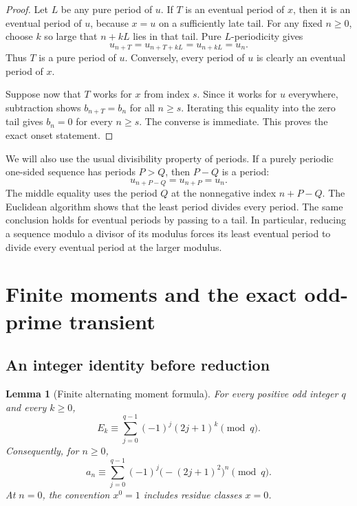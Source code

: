 \documentclass[11pt,a4paper]{article}
\numberwithin{equation}{section}
\newtheorem{lemma}[theorem]{Lemma}
\theoremstyle{definition}
\begin{document}
\begin{proof}
Let $L$ be any pure period of $u$. If $T$ is an eventual period of $x$,
then it is an eventual period of $u$, because $x=u$ on a sufficiently late
tail. For any fixed $n\ge0$, choose $k$ so large that $n+kL$ lies in that
tail. Pure $L$-periodicity gives
\[
u_{n+T}=u_{n+T+kL}=u_{n+kL}=u_n.
\]
Thus $T$ is a pure period of $u$. Conversely, every period of $u$ is
clearly an eventual period of $x$.

Suppose now that $T$ works for $x$ from index $s$. Since it works for $u$
everywhere, subtraction shows $b_{n+T}=b_n$ for all $n\ge s$.
Iterating this equality into the zero tail gives $b_n=0$ for every $n\ge s$.
The converse is immediate. This proves the exact onset statement.
\end{proof}

We will also use the usual divisibility property of periods. If a purely
periodic one-sided sequence has periods $P>Q$, then $P-Q$ is a period:
\[
u_{n+P-Q}=u_{n+P}=u_n.
\]
The middle equality uses the period $Q$ at the nonnegative index
$n+P-Q$. The Euclidean algorithm shows that the least period divides every
period. The same conclusion holds for eventual periods by passing to a
tail. In particular, reducing a sequence modulo a divisor of its modulus
forces its least eventual period to divide every eventual period at the
larger modulus.

\section{Finite moments and the exact odd-prime transient}
\label{sec:moments}

\subsection{An integer identity before reduction}

\begin{lemma}[Finite alternating moment formula]\label{lem:moment}
For every positive odd integer $q$ and every $k\ge0$,
\begin{equation}\label{eq:momentE}
E_k\equiv\sum_{j=0}^{q-1}(-1)^j(2j+1)^k\pmod q.
\end{equation}
Consequently, for $n\ge0$,
\begin{equation}\label{eq:momentA}
a_n\equiv\sum_{j=0}^{q-1}(-1)^j\bigl(-(2j+1)^2\bigr)^n\pmod q.
\end{equation}
At $n=0$, the convention $x^0=1$ includes residue classes $x=0$.
\end{lemma}
\end{document}
